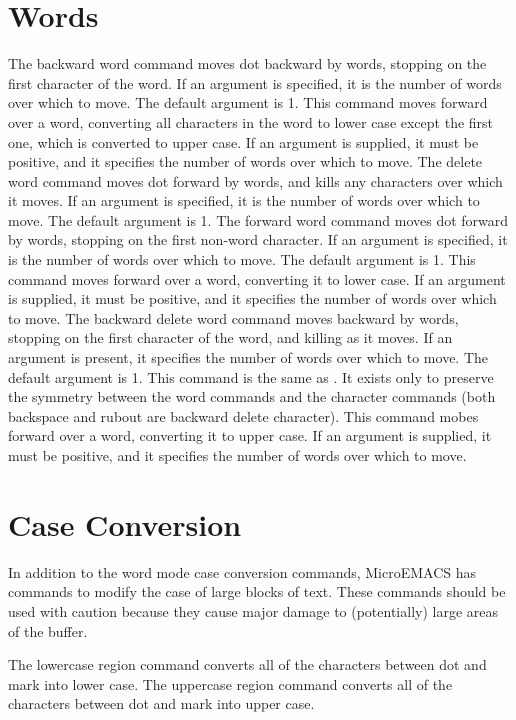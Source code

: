 \section{Words}
\begin{cmdlist}
The backward word command moves dot backward by words, stopping
on the first character of the word. If an argument is specified, it is the
number of words over which to move. The default argument is 1.
This command moves forward over a word, converting all characters
in the word to lower case except the first one, which is converted to
upper case. If an argument is supplied, it must be positive, and it specifies
the number of words over which to move.
The delete word command moves dot forward by words, and kills
any characters over which it moves. If an argument is specified, it is the
number of words over which to move. The default argument is 1.
The forward word command moves dot forward by words, stopping
on the first non-word character. If an argument is specified, it is the
number of words over which to move. The default argument is 1.
This command moves forward over a word, converting it to lower
case. If an argument is supplied, it must be positive, and it specifies the
number of words over which to move.
The backward delete word command moves backward by words, stopping
on the first character of the word, and killing as it moves. If an argument
is present, it specifies the number of words over which to move. The
default argument is 1.
This command is the same as . It exists only to preserve the
symmetry between the word commands and the character commands (both backspace
and rubout are backward delete character).
This command mobes forward over a word, converting it to upper
case. If an argument is supplied, it must be positive, and it specifies the
number of words over which to move.
\end{cmdlist}
\section{Case Conversion}
In addition to the word mode case conversion commands, MicroEMACS has
commands to modify the case of large blocks of text. These commands should
be used with caution because they cause major damage to (potentially)
large areas of the buffer.
\begin{cmdlist}
The lowercase region command converts all of the characters
between dot and mark into lower case.
The uppercase region command converts all of the characters
between dot and mark into upper case.
\end{cmdlist}

